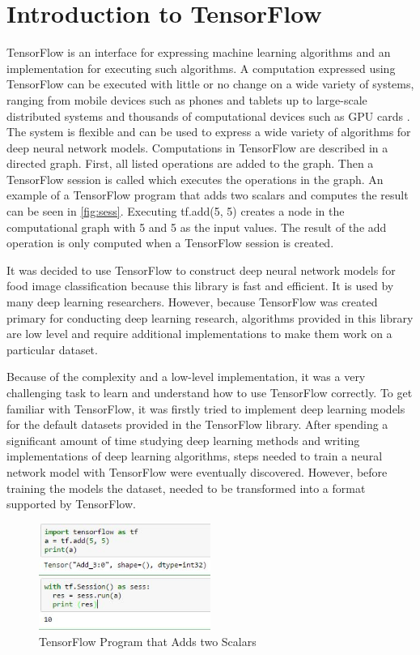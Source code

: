 \section{Introduction to TensorFlow}

TensorFlow is an interface for expressing machine learning algorithms and an implementation for executing such algorithms. A computation expressed using TensorFlow can be executed with little or no change on a wide variety of systems, ranging from mobile devices such as phones and tablets up to large-scale distributed systems and thousands of computational devices such as GPU cards \cite{abadi2016tensorflow}. The system is flexible and can be used to express a wide variety of algorithms for deep neural network models. Computations in TensorFlow are described in a directed graph. First, all listed operations are added to the graph. Then a TensorFlow session is called which executes the operations in the graph. An example of a TensorFlow program that adds two scalars and computes the result can be seen in \autoref{fig:sess}. Executing tf.add(5, 5) creates a node in the computational graph with 5 and 5 as the input values. The result of the add operation is only computed when a TensorFlow session is created. 

It was decided to use TensorFlow to construct deep neural network models for food image classification because this library is fast and efficient. It is used by many deep learning researchers. However, because TensorFlow was created primary for conducting deep learning research, algorithms provided in this library are low level and require additional implementations to make them work on a particular dataset.

Because of the complexity and a low-level implementation, it was a very challenging task to learn and understand how to use TensorFlow correctly.  To get familiar with TensorFlow, it was firstly tried to implement deep learning models for the default datasets provided in the TensorFlow library. After spending a significant amount of time studying deep learning methods and writing implementations of deep learning algorithms, steps needed to train a neural network model with TensorFlow were eventually discovered. However, before training the models the dataset, needed to be transformed into a format supported by TensorFlow. 

\begin{figure}[h]
\centering
\includegraphics[width=0.5\textwidth]{Figures/4/sess.jpg}
\caption{TensorFlow Program that Adds two Scalars}
\label{fig:sess}
\end{figure}

